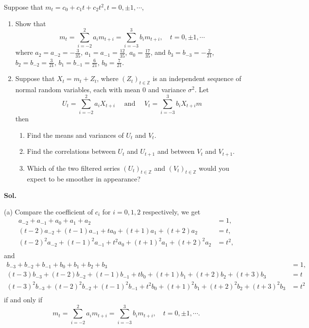 \documentclass[lang=en,11pt,a4paper,citestyle =authoryear]{elegantpaper}
\begin{document}
Suppose that $m_t = c_0 + c_1 t + c_2 t^2 , t = 0, \pm 1, \cdots$,
\begin{enumerate}
    \item[(a)] Show that
    \[
    m_t = \sum\limits_{i=-2}^2 a_im_{t+i} = \sum\limits_{i=-3}^3 b_im_{t+i},\quad t = 0,\pm 1,\cdots
    \]
where $a_2 = a_{-2} = -\tfrac{3}{35}$, $a_1 = a_{-1} = \tfrac{12}{35}$, $a_0 = \tfrac{17}{35}$, and $b_3 = b_{-3} = -\tfrac{2}{21}$, $b_2 = b_{-2} = \tfrac{3}{21}$, $b_1 = b_{-1} = \tfrac{6}{21}$, $b_0 = \tfrac{7}{21}$.
    \item[(b)] Suppose that $X_t= m_t + Z_t$, where $(Z_t)_{t\in\mathbb{Z}}$ is an independent sequence of normal random variables, each with mean $0$ and variance $\sigma^2$. Let \[U_t = \sum\limits_{i=-2}^2 a_iX_{t+i}\quad \text{ and }\quad V_t = \sum\limits_{i=-3}^3 b_iX_{t+i}m\] then
    \begin{enumerate}
        \item[(i)] Find the means and variances of $U_t$ and $V_t$.
        \item[(ii)] Find the correlations between $U_t$ and $U_{t+ 1}$ and between $V_t$ and $V_{t+1}$.
        \item[(iii)] Which of the two filtered series $(U_t)_{t\in\mathbb{Z}}$ and $(V_t)_{t\in\mathbb{Z}}$ would you expect to be smoother in appearance?
    \end{enumerate}
\end{enumerate}
\vspace{0.5em}
\textbf{Sol.} \par
(a) Compare the coefficient of $c_i$ for $i = 0,1,2$ respectively, we get
\[
\begin{aligned}
    a_{-2} + a_{-1} + a_0 + a_1 + a_2 &= 1, \\
    (t-2)a_{-2} + (t-1)a_{-1} + ta_0 + (t+1)a_1 + (t+2)a_2 &= t, \\
    (t-2)^2a_{-2} + (t-1)^2a_{-1} + t^2a_0 + (t+1)^2a_1 + (t+2)^2a_2 &= t^2,\\
\end{aligned}
\]
and
\[
\begin{aligned}
    b_{-3} + b_{-2} + b_{-1} + b_0 + b_1 + b_2 + b_3&= 1, \\
    (t-3)b_{-3} + (t-2)b_{-2} + (t-1)b_{-1} + tb_0 + (t+1)b_1 + (t+2)b_2 + (t+3)b_3&= t \\
    (t-3)^2b_{-3} + (t-2)^2b_{-2} + (t-1)^2b_{-1} + t^2b_0 + (t+1)^2b_1 + (t+2)^2b_2 + (t+3)^2b_3&= t^2\\
\end{aligned}
\]
if and only if \[
    m_t = \sum\limits_{i=-2}^2 a_im_{t+i} = \sum\limits_{i=-3}^3 b_im_{t+i},\quad t = 0,\pm 1,\cdots.
    \]
\end{document}

